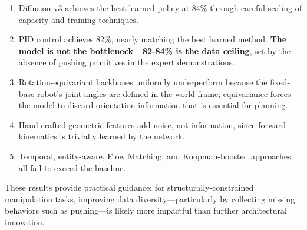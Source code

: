 \documentclass[twocolumn]{article}
\begin{document}
\begin{enumerate}
    \item Diffusion v3 achieves the best learned policy at 84\% through careful scaling of capacity and training techniques.
    \item PID control achieves 82\%, nearly matching the best learned method. \textbf{The model is not the bottleneck---82-84\% is the data ceiling}, set by the absence of pushing primitives in the expert demonstrations.
    \item Rotation-equivariant backbones uniformly underperform because the fixed-base robot's joint angles are defined in the world frame; equivariance forces the model to discard orientation information that is essential for planning.
    \item Hand-crafted geometric features add noise, not information, since forward kinematics is trivially learned by the network.
    \item Temporal, entity-aware, Flow Matching, and Koopman-boosted approaches all fail to exceed the baseline.
\end{enumerate}

These results provide practical guidance: for structurally-constrained manipulation tasks, improving data diversity---particularly by collecting missing behaviors such as pushing---is likely more impactful than further architectural innovation.
\end{document}
